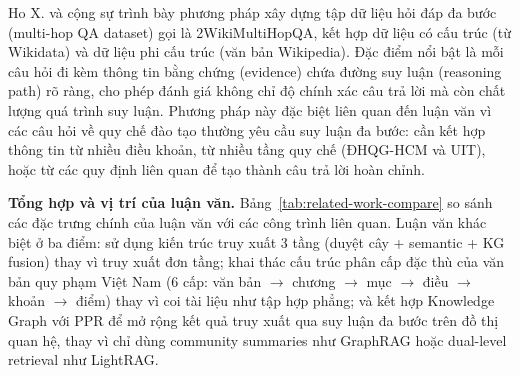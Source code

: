 Ho X. và cộng sự \cite{ho2020constructing} trình bày phương pháp xây dựng tập dữ liệu
hỏi đáp đa bước (multi-hop QA dataset) gọi là 2WikiMultiHopQA, kết hợp dữ liệu có
cấu trúc (từ Wikidata) và dữ liệu phi cấu trúc (văn bản Wikipedia). Đặc điểm nổi
bật là mỗi câu hỏi đi kèm thông tin bằng chứng (evidence) chứa đường suy luận
(reasoning path) rõ ràng, cho phép đánh giá không chỉ độ chính xác câu trả lời mà
còn chất lượng quá trình suy luận. Phương pháp này đặc biệt liên quan đến luận văn
vì các câu hỏi về quy chế đào tạo thường yêu cầu suy luận đa bước: cần kết hợp
thông tin từ nhiều điều khoản, từ nhiều tầng quy chế (ĐHQG-HCM và UIT), hoặc từ
các quy định liên quan để tạo thành câu trả lời hoàn chỉnh.

\vspace{0.5em}
\noindent\textbf{Tổng hợp và vị trí của luận văn.} Bảng~\ref{tab:related-work-compare}
so sánh các đặc trưng chính của luận văn với các công trình liên quan. Luận văn khác
biệt ở ba điểm: sử dụng kiến trúc truy xuất 3 tầng (duyệt cây + semantic + KG
fusion) thay vì truy xuất đơn tầng; khai thác cấu trúc phân cấp đặc thù của
văn bản quy phạm Việt Nam (6 cấp: văn bản $\rightarrow$ chương $\rightarrow$ mục
$\rightarrow$ điều $\rightarrow$ khoản $\rightarrow$ điểm) thay vì coi tài liệu như
tập hợp phẳng; và kết hợp Knowledge Graph với PPR để mở rộng kết quả truy xuất
qua suy luận đa bước trên đồ thị quan hệ, thay vì chỉ dùng community summaries
như GraphRAG hoặc dual-level retrieval như LightRAG.

